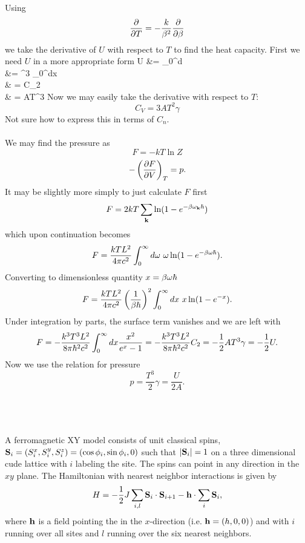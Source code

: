 \documentclass[10pt,letterpaper]{article}
\begin{document}
	\item
	Using
	\[
		\pdiff{T} = -\frac{k}{\beta^2}\pdiff{\beta}
	\]
	we take the derivative of $U$ with respect to $T$ to find the heat capacity. First we need $U$ in a more
	appropriate form
	\ba
		U &=  \int_0^\infty d\omega \frac{\omega^2}{e^{\beta\omega\h}-1}  \\
		&= ^3 \int_0^\infty dx\  \\
		& =  C_2 \\
		& = AT^3\gamma
	\ea
	Now we may easily take the derivative with respect to $T$:
	\[
		C_V = 3AT^2\gamma
	\]
	Not sure how to express this in terms of $C_n$. \\ \\
	We may find the pressure as
	\[
		F = -kT\ln Z
	\]
	\[
		-\plr{\pdiff[F]{V}}_T = p.
	\]
	It may be slightly more simply to just calculate $F$ first
	\[
		F = 2kT\sum_\vect k \ln(1-e^{-\beta\omega_\vect k\h})
	\]
	which upon continuation becomes
	\[
		F = \frac{kTL^2}{4\pi c^2}\int_0^\infty d\omega\ \omega\ln(1-e^{-\beta\omega\h}).
	\]
	Converting to dimensionless quantity $x = \beta \omega \h$
	\[
		F= \frac{kTL^2}{4\pi c^2}\pfrac{1}{\beta\h}^2 \int_0^\infty dx\ x \ln(1-e^{-x}).
	\]
	Under integration by parts, the surface term vanishes and we are left with
	\[
		F= -\frac{k^3T^3L^2}{8\pi \h ^2c^2} \int_0^\infty dx \frac{x^2}{e^x-1} = -\frac{k^3T^3L^2}{8\pi \h ^2c^2}C_2
		= -\frac{1}{2}AT^3\gamma = -\frac{1}{2}U.
	\]
	Now we use the relation for pressure
	\[
		p = \frac{T^3}{2}\gamma = \frac{U}{2A}.
	\]
	\\ \\ \\
	
	\eenum 
	\item
	A ferromagnetic XY model consists of unit classical spins, $\vect S_i = (S_i^x,S_i^y,S_i^z) =
	(\cos\phi_i,\sin\phi_i,0)$ such that $|\vect S_i|=1$ on a three dimensional cude lattice with $i$ labeling
	the site. The spins can point in any direction in the $xy$ plane. The Hamiltonian with nearest neighbor 
	interactions is given by
	\[
		H = -\frac{1}{2} J\sum_{i,l}\vect S_i\cdot \vect S_{i+1} - \vect h\cdot \sum_i \vect S_i,
	\]
	where $\vect h$ is a field pointing the in the $x$-direction (i.e. $\vect h = (h,0,0)$) and with $i$ running
	over all sites and $l$ running over the six nearest neighbors.
	
\end{document}
